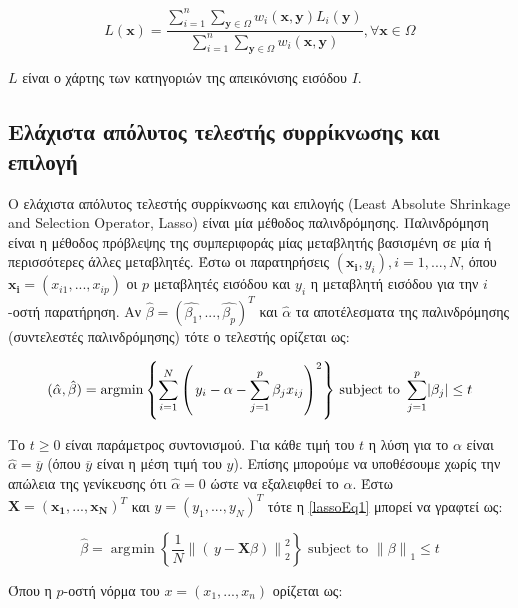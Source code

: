 \documentclass[a4paper,12pt]{article}
\DeclareMathOperator*{\argmin}{\arg\!\min}
\DeclarePairedDelimiter\abs{\lvert}{\rvert}
\newcommand\norm[1]{\left\lVert#1\right\rVert}
\begin{document}
\begin{equation} \label{label_fusion:1}
    L(\bm{x})=\frac{ \sum_{i=1}^{n}  \sum_{\bm{y}\in\Omega}
                     w_i(\bm{x},\bm{y})L_i(\bm{y})}
    { \sum_{i=1}^{n}  \sum_{\bm{y}\in\Omega} w_i(\bm{x},\bm{y}) }
    , \forall \bm{x}\in\Omega
\end{equation}

$L$ είναι ο χάρτης των κατηγοριών της απεικόνισης εισόδου $I$.

\subsection{Ελάχιστα απόλυτος τελεστής συρρίκνωσης και επιλογή} \label{lasso:1}

Ο ελάχιστα απόλυτος τελεστής συρρίκνωσης και επιλογής (Least Absolute Shrinkage
and Selection Operator, Lasso) \cite{Lasso:1} είναι μία μέθοδος παλινδρόμησης.
Παλινδρόμηση είναι η μέθοδος πρόβλεψης της συμπεριφοράς μίας μεταβλητής
βασισμένη σε μία ή περισσότερες άλλες μεταβλητές. Έστω οι παρατηρήσεις
$(\bm{x_i},y_i), i=1,...,N$, όπου $\bm{x_i}=(x_{i1},...,x_{ip})$ οι $p$
μεταβλητές εισόδου και $y_i$ η μεταβλητή εισόδου για την $i$-οστή παρατήρηση. Αν
$\hat{\beta} = (\hat{{\beta}_1},...,\hat{{\beta}_p})^T$ και $\hat{\alpha}$ τα
αποτέλεσματα της παλινδρόμησης (συντελεστές παλινδρόμησης) τότε ο τελεστής
ορίζεται ως:

\begin{equation}\label{lassoEq1}
    (\hat{\alpha}, \hat{\beta}) = 
    \argmin{\left\{\sum_{i=1}^{N} {\left(\,y_i-\alpha- \sum_{j=1}^{p}
    \beta_{j}x_{ij}\right)}^2 \right\}} 
    \text{ subject to }
    \sum_{j=1}^{p} \abs{\beta_j} \leq t
\end{equation}

Το $t \geq 0$ είναι παράμετρος συντονισμού. Για κάθε τιμή του $t$ η λύση για το
$\alpha$ είναι $\hat{\alpha}=\overline{y}$ (όπου $\overline{y}$ είναι η μέση
τιμή του $y$). Επίσης μπορούμε να υποθέσουμε χωρίς την απώλεια της γενίκευσης
ότι $\hat{\alpha}=0$ ώστε να εξαλειφθεί το $\alpha$. Έστω $\bm{X} =
(\bm{x_1},...,\bm{x_N})^T$ και $y = (y_1,...,y_N)^T$ τότε η \eqref{lassoEq1}
μπορεί να γραφτεί ως:

\begin{equation}\label{lassoEq2}
    \hat{\beta} = 
    \argmin{\left\{\frac{1}{N} \norm{\left(\,y - \bm{X} \beta\right)}_2^2
    \right\}} 
    \text{ subject to }
    \norm{\beta}_1 \leq t
\end{equation}

Όπου η $p$-οστή νόρμα του $x=(x_1,...,x_n)$ ορίζεται ως:
\end{document}

